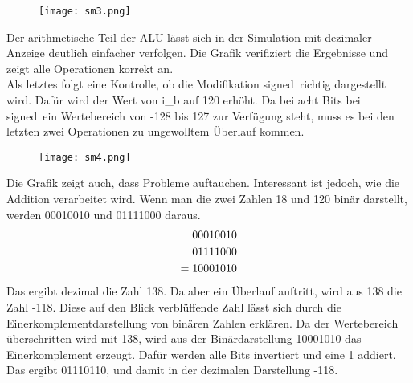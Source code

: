 \documentclass[12pt,a4paper]{scrartcl}	%
\begin{document}
\begin{figure}[h]
	
	\texttt{[image: sm3.png]}
\end{figure}
Der arithmetische Teil der ALU lässt sich in der Simulation mit dezimaler Anzeige deutlich einfacher verfolgen. Die Grafik verifiziert die Ergebnisse und zeigt alle Operationen korrekt an.\\
Als letztes folgt eine Kontrolle, ob die Modifikation \glqq signed\grqq~richtig dargestellt wird. Dafür wird der Wert von i\_b auf 120 erhöht. Da bei acht Bits bei \glqq signed\grqq~ein Wertebereich von -128 bis 127 zur Verfügung steht, muss es bei den letzten zwei Operationen zu ungewolltem Überlauf kommen.
\begin{figure}[htb]
	
	\texttt{[image: sm4.png]}
\end{figure}
Die Grafik zeigt auch, dass Probleme auftauchen. Interessant ist jedoch, wie die Addition verarbeitet wird. Wenn man die zwei Zahlen 18 und 120 binär darstellt, werden 00010010 und 01111000 daraus.
\begin{align}
		00010010 \notag\\
		01111000\notag\\
	= 	10001010\notag
\end{align}	
Das ergibt dezimal die Zahl 138. Da aber ein Überlauf auftritt, wird aus 138 die Zahl \mbox{-118}. Diese auf den Blick verblüffende Zahl lässt sich durch die Einerkomplementdarstellung von binären Zahlen erklären. Da der Wertebereich überschritten wird mit 138, wird aus der Binärdarstellung 10001010 das Einerkomplement erzeugt. Dafür werden alle Bits invertiert und eine 1 addiert. Das ergibt 01110110, und damit in der dezimalen Darstellung -118.
\clearpage
\end{document}

